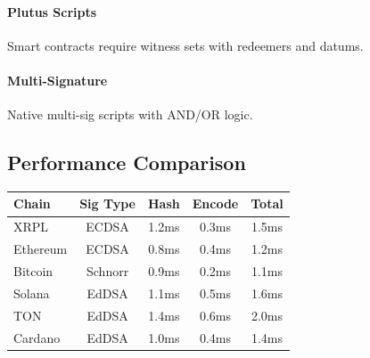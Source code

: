 \paragraph{Plutus Scripts} Smart contracts require witness sets with redeemers and datums.

\paragraph{Multi-Signature} Native multi-sig scripts with AND/OR logic.

\subsection{Performance Comparison}

\begin{table}[h]
\centering
\small
\begin{tabular}{@{}lcccc@{}}
\toprule
\textbf{Chain} & \textbf{Sig Type} & \textbf{Hash} & \textbf{Encode} & \textbf{Total} \\
\midrule
XRPL & ECDSA & 1.2ms & 0.3ms & 1.5ms \\
Ethereum & ECDSA & 0.8ms & 0.4ms & 1.2ms \\
Bitcoin & Schnorr & 0.9ms & 0.2ms & 1.1ms \\
Solana & EdDSA & 1.1ms & 0.5ms & 1.6ms \\
TON & EdDSA & 1.4ms & 0.6ms & 2.0ms \\
Cardano & EdDSA & 1.0ms & 0.4ms & 1.4ms \\
\bottomrule
\end{tabular}

\label{tab:adapter_performance}
\end{table}

